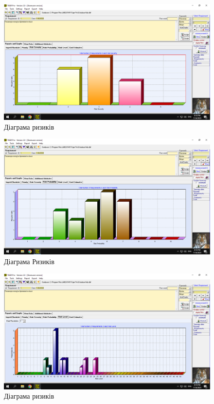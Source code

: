 \documentclass[14pt]{extreport}
\begin{document}
\begin{normalsize}
	\begin{figure}[H]
		\centering
		\includegraphics[scale=0.5]{6}
		\caption{Діаграма ризиків}
	\end{figure}
	
	\begin{figure}[H]
		\centering
		\includegraphics[scale=0.5]{7}
		\caption{Діаграма Ризиків}
	\end{figure}
	
	\begin{figure}[H]
		\centering
		\includegraphics[scale=0.5]{8}
		\caption{Діаграма ризиків}
	\end{figure}
	

\end{normalsize}
\end{document}
